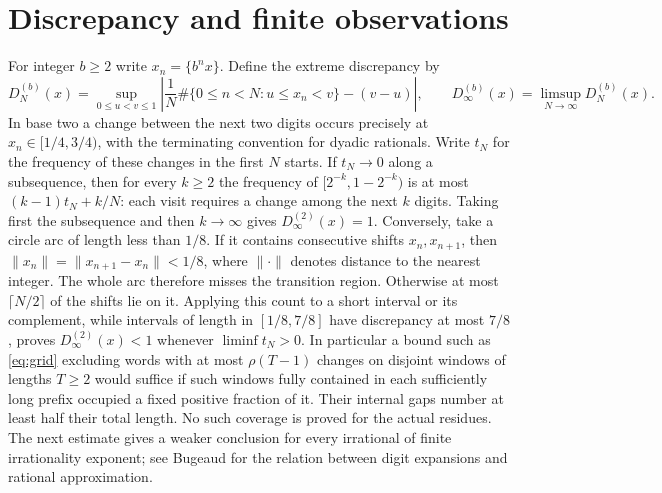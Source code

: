 \documentclass[11pt]{article}
\begin{document}
\section{Discrepancy and finite observations}\label{sec:disc}
For integer $b\ge2$ write $x_n=\{b^nx\}$. Define the extreme discrepancy by
\[
 D_N^{(b)}(x)=\sup_{0\le u<v\le1}
 \left|\frac1N\#\{0\le n<N:u\le x_n<v\}-(v-u)\right|,
 \qquad D_\infty^{(b)}(x)=\limsup_{N\to\infty}D_N^{(b)}(x).
\]
In base two a change between the next two digits occurs precisely at
$x_n\in[1/4,3/4)$, with the terminating convention for dyadic rationals.
Write $t_N$ for the frequency of these changes in the first $N$ starts. If $t_N\to0$ along a subsequence, then for every $k\ge2$ the frequency of $[2^{-k},1-2^{-k})$ is at most $(k-1)t_N+k/N$: each visit requires a change among the next $k$ digits. Taking first the subsequence and then $k\to\infty$ gives $D_\infty^{(2)}(x)=1$. Conversely, take a circle arc of length less than $1/8$. If it contains consecutive shifts $x_n,x_{n+1}$, then $\|x_n\|=\|x_{n+1}-x_n\|<1/8$, where $\|\cdot\|$ denotes distance to the nearest integer. The whole arc therefore misses the transition region. Otherwise at most $\lceil N/2\rceil$ of the shifts lie on it. Applying this count to a short interval or its complement, while intervals of length in $[1/8,7/8]$ have discrepancy at most $7/8$, proves $D_\infty^{(2)}(x)<1$ whenever $\liminf t_N>0$.
In particular a bound such as \eqref{eq:grid} excluding words with at most
$\rho(T-1)$ changes on disjoint windows of lengths $T\ge2$ would suffice if
such windows fully contained in each sufficiently long prefix occupied a
fixed positive fraction of it. Their internal gaps number at least half
their total length. No such coverage is proved for the actual residues.
The next estimate gives a weaker conclusion for every irrational of finite irrationality exponent; see Bugeaud \cite{bugeaud} for the relation between digit expansions and rational approximation.
\end{document}
